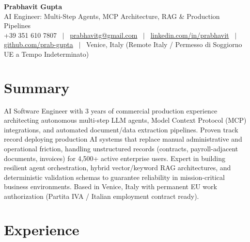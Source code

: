 \documentclass[a4paper,10pt]{article}
\begin{document}
\begin{minipage}[c]{0.80\textwidth}
 {\Huge\bfseries Prabhavit Gupta}\\[3pt]
 {\color{accent}\large AI Engineer: Multi-Step Agents, MCP Architecture, RAG \& Production Pipelines}\\[6pt]
 {\footnotesize +39 351 610 7807 ~$\vert$~
 \href{mailto:prabhavitg@gmail.com}{prabhavitg@gmail.com} ~$\vert$~
 \href{https://www.linkedin.com/in/prabhavit/}{linkedin.com/in/prabhavit} ~$\vert$~
 \href{https://github.com/prab-gupta}{github.com/prab-gupta} ~$\vert$~
 Venice, Italy (Remote Italy / Permesso di Soggiorno UE a Tempo Indeterminato)}
\end{minipage}\hfill

\section{Summary}
AI Software Engineer with 3 years of commercial production experience architecting autonomous multi-step LLM agents, Model Context Protocol (MCP) integrations, and automated document/data extraction pipelines. Proven track record deploying production AI systems that replace manual administrative and operational friction, handling unstructured records (contracts, payroll-adjacent documents, invoices) for 4,500+ active enterprise users. Expert in building resilient agent orchestration, hybrid vector/keyword RAG architectures, and deterministic validation schemas to guarantee reliability in mission-critical business environments. Based in Venice, Italy with permanent EU work authorization (Partita IVA / Italian employment contract ready).

\section{Experience}
\end{document}
